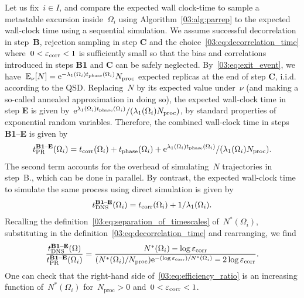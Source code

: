     Let us fix~$i\in I$, and compare the expected wall clock-time to sample a metastable excursion inside~$\Omega_i$ using Algorithm~\ref{03:alg:parrep} to the expected wall-clock time using a sequential simulation.
    We assume successful decorrelation in step~{\bf B}, rejection sampling in step {\bf C} and the choice~\eqref{03:eq:decorrelation_time} where~$0<\varepsilon_{\operatorname{corr}}<1$ is sufficiently small so that the bias and correlations introduced in steps {\bf B1} and {\bf C} can be safely neglected.
    By~\eqref{03:eq:exit_event}, we have~$\mathbb{E}_\nu[N] = \mathrm{e}^{-\lambda_1(\Omega_i) t_{\operatorname{phase}}(\Omega_i)}N_{\mathrm{proc}}$ expected replicas at the end of step {\bf C}, i.i.d. according to the QSD.
    Replacing~$N$ by its expected value under~$\nu$ (and making a so-called annealed approximation in doing so), the expected wall-clock time in step {\bf E} is given by~$\mathrm{e}^{\lambda_1(\Omega_i)t_{\operatorname{phase}}(\Omega_i)}/(\lambda_1(\Omega_i)N_{\mathrm{proc}})$, by standard properties of exponential random variables. Therefore, the combined wall-clock time in steps {\bf B1}--{\bf E} is given by
    \begin{equation}
        \label{03:eq:wall_clock_time}
        t_{\mathrm{PR}}^{\text{{\bf B1}--{\bf E}}}(\Omega_i) = t_{\operatorname{corr}}(\Omega_i) + t_{\operatorname{phase}}(\Omega_i) + \mathrm{e}^{\lambda_1(\Omega_i)t_{\operatorname{phase}}(\Omega_i)}/(\lambda_1(\Omega_i)N_{\mathrm{proc}}).
    \end{equation}
    The second term accounts for the overhead of simulating~$N$ trajectories in step~B., which can be done in parallel.
    By contrast, the expected wall-clock time to simulate the same process using direct simulation is given by
    \begin{equation}
        \label{03:eq:wall_clock_time_direct}
        t_{\mathrm{DNS}}^{\text{{\bf B1}--{\bf E}}}(\Omega_i) = t_{\operatorname{corr}}(\Omega_i) + 1/\lambda_1(\Omega_i).
    \end{equation}
    Recalling the definition~\eqref{03:eq:separation_of_timescales} of~$N^*(\Omega_i)$, substituting in the definition~\eqref{03:eq:decorrelation_time} and rearranging, we find
    \begin{equation}
    \label{03:eq:efficiency_ratio}
    \frac{t_{\mathrm{DNS}}^{\text{\textbf{B1--E}}}(\Omega)}{t_{\mathrm{PR}}^{\text{\textbf{B1--E}}}(\Omega_i)} = \frac{N^*(\Omega_i)-\log\varepsilon_{\operatorname{corr}}}{(N^*(\Omega_i)/N_{\mathrm{proc}})\mathrm{e}^{ -(\log\varepsilon_{\operatorname{corr}})/N^*(\Omega_i) }-2\log\varepsilon_{\operatorname{corr}}}.
    \end{equation}
    One can check that the right-hand side of~\eqref{03:eq:efficiency_ratio} is an increasing function of~$N^*(\Omega_i)$ for~$N_{\mathrm{proc}}>0$ and~$0<\varepsilon_{\operatorname{corr}}<1$.
